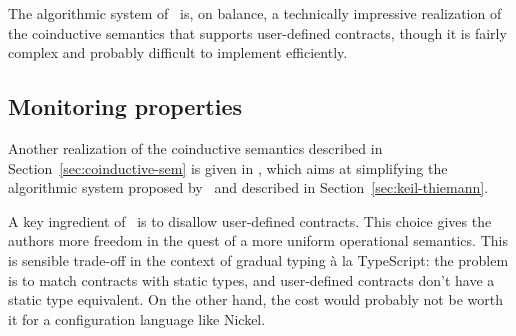\documentclass[sigplan,10pt,review,anonymous]{acmart}
\newcommand{\nickel}[1]{\lstinline[language=nickel]{#1}}
\begin{document}
The algorithmic system of~\cite{KeilThiemannUnionIntersection} is, on balance, a
technically impressive realization of the coinductive semantics that supports
user-defined contracts, though it is fairly complex and probably difficult to
implement efficiently.

\subsection{Monitoring properties}
\label{sec:will-morr-wadl}

Another realization of the coinductive semantics described in
Section~\ref{sec:coinductive-sem} is given in \cite{RootCauseOfBlame}, which
aims at simplifying the algorithmic system proposed
by~\cite{KeilThiemannUnionIntersection} and described in
Section~\ref{sec:keil-thiemann}.

A key ingredient of~\cite{RootCauseOfBlame} is to disallow user-defined
contracts. This choice gives the authors more freedom in the quest of
a more uniform operational semantics. This is sensible trade-off in
the context of gradual typing à la TypeScript: the problem is to match
contracts with static types, and user-defined contracts don't have a
static type equivalent. On the other hand, the cost would probably not
be worth it for a configuration language like Nickel.

%


\end{document}
